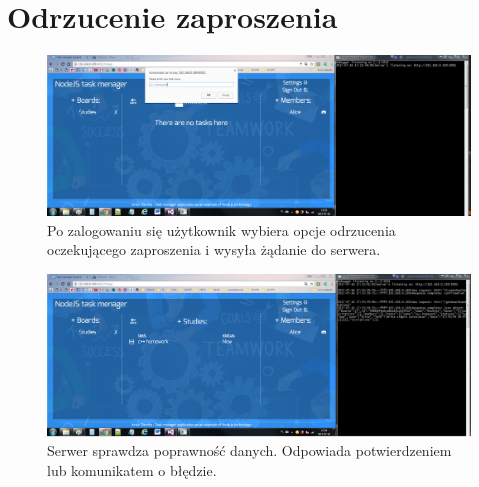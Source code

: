 \documentclass[12pt]{report}
\begin{document}
\section{Odrzucenie zaproszenia}
\begin{figure}[!hb]
\centering
\includegraphics[width=\textwidth,height=\textheight,keepaspectratio]{A1.png}
\captionsetup{labelformat=empty}
\caption[]{Po zalogowaniu się użytkownik wybiera opcje odrzucenia oczekującego zaproszenia i wysyła żądanie do serwera.}
\end{figure}
\begin{figure}[!hb]
\centering
\includegraphics[width=\textwidth,height=\textheight,keepaspectratio]{A2.png}
\captionsetup{labelformat=empty}
\caption[]{Serwer sprawdza poprawność danych. Odpowiada potwierdzeniem lub komunikatem o błędzie.}
\end{figure}
\end{document}
